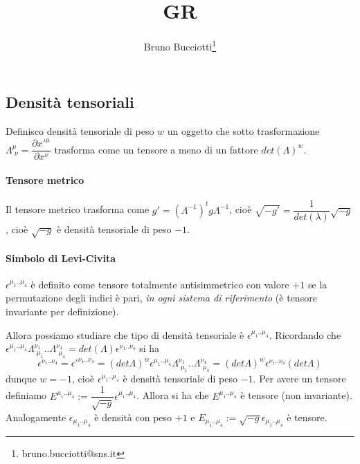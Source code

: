 \documentclass[12pt,a4paper]{article}
\author{Bruno Bucciotti\thanks{bruno.bucciotti@sns.it}}
\title{GR}
\begin{document}
	\maketitle
	\begin{abstract}
	\end{abstract}
	
	\subsection{Densità tensoriali}
	Definisco densità tensoriale di peso $w$ un oggetto che sotto trasformazione $\Lambda^\mu_{\,\,\nu} = \dfrac{\partial x'^\mu}{\partial x^\nu}$ trasforma come un tensore a meno di un fattore $det(\Lambda)^w$.
	\paragraph{Tensore metrico} Il tensore metrico trasforma come $g' = (\Lambda^{-1})^t g \Lambda^{-1}$, cioè $\sqrt{-g'} = \dfrac{1}{det(\lambda)} \sqrt{-g}$, cioè $\sqrt{-g}$ è densità tensoriale di peso $-1$.
	\paragraph{Simbolo di Levi-Civita} $\epsilon^{\mu_1..\mu_4}$ è definito come tensore totalmente antisimmetrico con valore $+1$ se la permutazione degli indici è pari, \emph{in ogni sistema di riferimento} (è tensore invariante per definizione).
	
	Allora possiamo studiare che tipo di densità tensoriale è $\epsilon^{\mu_1..\mu_4}$. Ricordando che $\epsilon^{\mu_1..\mu_4} \Lambda^{\nu_1}_{\,\,\mu_1} .. \Lambda^{\nu_4}_{\,\,\mu_4} = det(\Lambda) \epsilon^{\nu_1..\nu_4}$ si ha
	\[ \epsilon^{\nu_1..\nu_4} = \epsilon'^{\nu_1..\nu_4} = (det\Lambda)^w \epsilon^{\mu_1..\mu_4} \Lambda^{\nu_1}_{\,\,\mu_1} .. \Lambda^{\nu_4}_{\,\,\mu_4} = (det\Lambda)^w \epsilon^{\nu_1..\nu_4} (det\Lambda) \]
	dunque $w=-1$, cioè $\epsilon^{\mu_1..\mu_4}$ è densità tensoriale di peso $-1$. Per avere un tensore definiamo $E^{\mu_1..\mu_4} := \dfrac{1}{\sqrt{-g}} \epsilon^{\mu_1..\mu_4}$. Allora si ha che $E^{\mu_1..\mu_4}$ è tensore (non invariante). Analogamente $\epsilon_{\mu_1..\mu_4}$ è densità con peso $+1$ e $E_{\mu_1..\mu_4} := \sqrt{-g} \epsilon_{\mu_1..\mu_4}$ è tensore.
	
	
\end{document}
